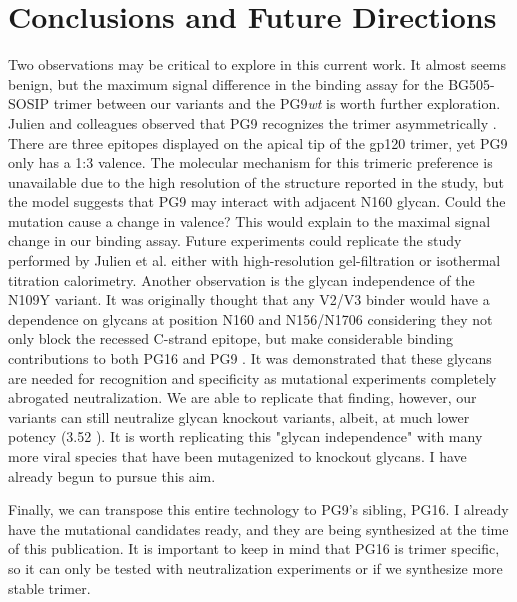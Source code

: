 \section{Conclusions and Future Directions}
Two observations may be critical to explore in this current work. It almost seems benign, but the maximum signal difference in the binding assay for the BG505-SOSIP trimer between our variants and the PG9\textit{wt} is worth further exploration. Julien and colleagues observed that PG9 recognizes the trimer asymmetrically \citep{Julien:2013jp}. There are three epitopes displayed on the apical tip of the gp120 trimer, yet PG9 only has a 1:3 valence. The molecular mechanism for this trimeric preference is unavailable due to the high resolution of the structure reported in the study, but the model suggests that PG9 may interact with adjacent N160 glycan. Could the mutation cause a change in valence? This would explain to the maximal signal change in our binding assay. Future experiments could replicate the study performed by Julien et al. either with high-resolution gel-filtration or isothermal titration calorimetry.
Another observation is the glycan independence of the N109Y variant. It was originally thought that any V2/V3 binder would have a dependence on glycans at position N160 and N156/N1706 considering they not only block the recessed C-strand epitope, but make considerable binding contributions to both PG16 and PG9 \citep{McLellan:2011dg,Pancera:2013ev}. It was demonstrated that these glycans are needed for recognition and specificity as mutational experiments completely abrogated neutralization. We are able to replicate that finding, however, our variants can still neutralize glycan knockout variants, albeit, at much lower potency (3.52 \mcml). It is worth replicating this "glycan independence" with many more viral species that have been mutagenized to knockout glycans. I have already begun to pursue this aim. 

Finally, we can transpose this entire technology to PG9's sibling, PG16. I already have the mutational candidates ready, and they are being synthesized at the time of this publication. It is important to keep in mind that PG16 is trimer specific, so it can only be tested with neutralization experiments or if we synthesize more stable trimer.





